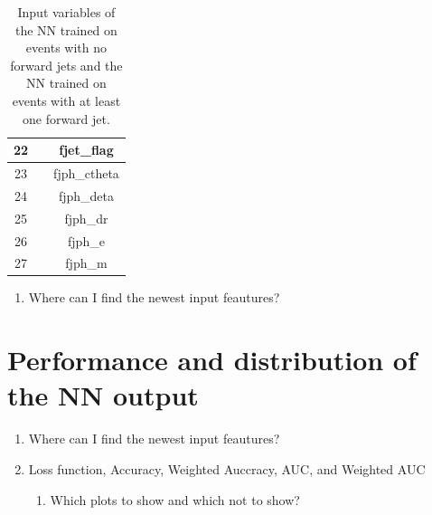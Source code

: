 \begin{table}
\begin{tabular}{c|c|c}
        22 &&                                        fjet\_flag \\ \hline
        23 &&                                      fjph\_ctheta \\ \hline
        24 &&                                        fjph\_deta \\ \hline
        25 &&                                          fjph\_dr \\ \hline
        26 &&                                           fjph\_e \\ \hline
        27 &&                                           fjph\_m \\ \hline
        \bottomrule 
    \end{tabular}
    \caption{Input variables of the NN trained on events with no forward jets and the NN trained on events with at least one forward jet.}
    \label{tab:features}
\end{table}

\begin{enumerate}
    \item Where can I find the newest input feautures?
\end{enumerate}
\section{Performance and distribution of the NN output}
\begin{enumerate}
    \item Where can I find the newest input feautures?
    \item Loss function, Accuracy, Weighted Auccracy, AUC, and Weighted AUC 
    \begin{enumerate}
        \item Which plots to show and which not to show?
    \end{enumerate}
\end{enumerate}